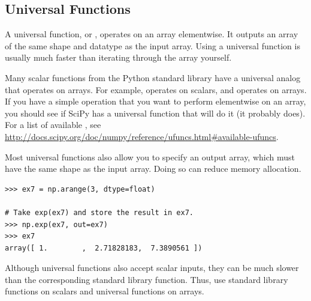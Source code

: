 \subsection*{Universal Functions}

A universal function, or , operates on an array elementwise. 
It outputs an array of the same shape and datatype as the input array. 
Using a universal function is usually much faster than iterating through the array yourself.

Many scalar functions from the Python standard library have a universal analog that operates on arrays. 
For example,  operates on scalars, and  operates on arrays. 
If you have a simple operation that you want to perform elementwise on an array, you should see if SciPy has a universal function that will do it (it probably does). 
For a list of available , see \url{http://docs.scipy.org/doc/numpy/reference/ufuncs.html#available-ufuncs}.

Most universal functions also allow you to specify an output array, which must have the same shape as the input array.
Doing so can reduce memory allocation. 

\begin{lstlisting}
>>> ex7 = np.arange(3, dtype=float)

# Take exp(ex7) and store the result in ex7.
>>> np.exp(ex7, out=ex7) 
>>> ex7
array([ 1.        ,  2.71828183,  7.3890561 ])
\end{lstlisting}

Although universal functions also accept scalar inputs, they can be much slower than the corresponding standard library function. 
Thus, use standard library functions on scalars and universal functions on arrays.

